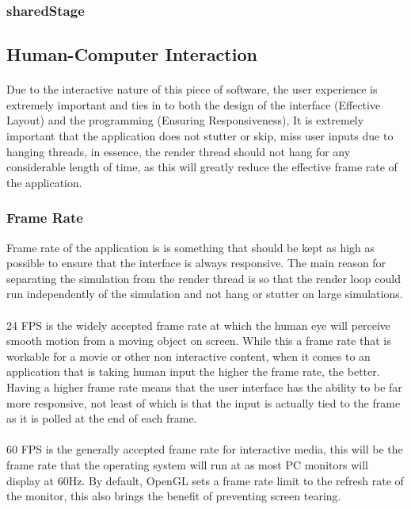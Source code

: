 \pagebreak
\subsubsection{sharedStage}
\texttt{}

\subsection{Human-Computer Interaction}
\paragraph{}
Due to the interactive nature of this piece of software, the user experience is extremely important and ties in to both the design of the interface (Effective Layout) and the programming (Ensuring Responsiveness), It is extremely important that the application does not stutter or skip, miss user inputs due to hanging threads, in essence, the render thread should not hang for any considerable length of time, as this will greatly reduce the effective frame rate of the application.

\subsubsection{Frame Rate}
Frame rate of the application is is something that should be kept as high as possible to ensure that the interface is always responsive. The main reason for separating the simulation from the render thread is so that the render loop could run independently of the simulation and not hang or stutter on large simulations.

\paragraph{}
24 FPS is the widely accepted frame rate at which the human eye will perceive smooth motion from a moving object on screen. While this a frame rate that is workable for a movie or other non interactive content, when it comes to an application that is taking human input the higher the frame rate, the better. Having a higher frame rate means that the user interface has the ability to be far more responsive, not least of which is that the input is actually tied to the frame as it is polled at the end of each frame.

\paragraph{}
60 FPS is the generally accepted frame rate for interactive media, this will be the frame rate that the operating system will run at as most PC monitors will display at 60Hz. By default, OpenGL sets a frame rate limit to the refresh rate of the monitor, this also brings the benefit of preventing screen tearing.

